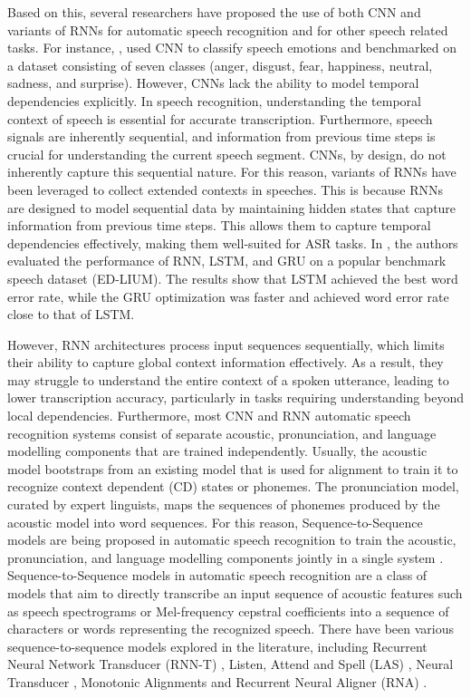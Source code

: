 \documentclass[preprint,12pt]{elsarticle}
\begin{document}
Based on this, several researchers have proposed the use of both CNN and variants of RNNs for automatic speech recognition and for other speech related tasks. For instance, \citep{HEMA2023109492}, used CNN to classify speech emotions and benchmarked on a dataset consisting of seven classes (anger, disgust, fear, happiness, neutral, sadness, and surprise). However, CNNs lack the ability to model temporal dependencies explicitly. In speech recognition, understanding the temporal context of speech is essential for accurate transcription. Furthermore, speech signals are inherently sequential, and information from previous time steps is crucial for understanding the current speech segment. CNNs, by design, do not inherently capture this sequential nature. For this reason, variants of RNNs have been leveraged to collect extended contexts in speeches. This is because RNNs are designed to model sequential data by maintaining hidden states that capture information from previous time steps. This allows them to capture temporal dependencies effectively, making them well-suited for ASR tasks. In \citep{shewalkar2019performance}, the authors evaluated the performance of RNN, LSTM, and GRU on a popular benchmark speech dataset (ED-LIUM). The results show that LSTM achieved the best word error rate, while the GRU optimization was faster and achieved word error rate close to that of LSTM.  

However, RNN architectures process input sequences sequentially, which limits their ability to capture global context information effectively. As a result, they may struggle to understand the entire context of a spoken utterance, leading to lower transcription accuracy, particularly in tasks requiring understanding beyond local dependencies. Furthermore, most CNN and RNN automatic speech recognition systems consist of separate acoustic, pronunciation, and language modelling components that are trained independently. Usually, the acoustic model bootstraps from an existing model that is used for alignment to train it to recognize context dependent (CD) states or phonemes. The pronunciation model, curated by expert linguists, maps the sequences of phonemes produced by the acoustic model into word sequences. For this reason,  Sequence-to-Sequence models are being proposed in automatic speech recognition to train the acoustic, pronunciation, and language modelling components jointly in a single system \citep{prabhavalkar2017comparison}. Sequence-to-Sequence models in automatic speech recognition are a class of models that aim to directly transcribe an input sequence of acoustic features such as speech spectrograms or Mel-frequency cepstral coefficients into a sequence of characters or words representing the recognized speech. There have been various sequence-to-sequence models explored in the literature, including Recurrent Neural Network Transducer (RNN-T) \citep{graves2012sequence}, Listen, Attend and Spell (LAS) \citep{chan2015listen}, Neural Transducer \citep{jaitly2016online}, Monotonic Alignments \citep{raffel2017online} and Recurrent Neural Aligner (RNA) \citep{sak2017recurrent}.
\end{document}

